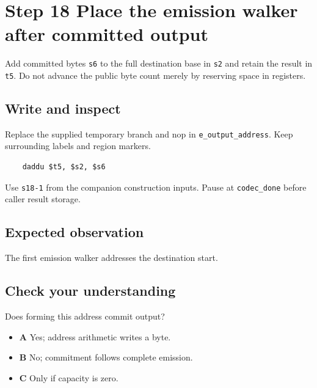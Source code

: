 \section{Step 18 Place the emission walker after committed output}\label{delta-s18}

Add committed bytes \texttt{s6} to the full destination base in \texttt{s2} and retain the result in \texttt{t5}. Do not advance the public byte count merely by reserving space in registers.

\subsection{Write and inspect}
Replace the supplied temporary branch and nop in \texttt{e\_output\_address}. Keep surrounding labels and region markers.

\begin{verbatim}
    daddu $t5, $s2, $s6
\end{verbatim}
Use \texttt{s18-1} from the companion construction inputs. Pause at \texttt{codec\_done} before caller result storage.

\subsection{Expected observation}
The first emission walker addresses the destination start.

\subsection{Check your understanding}
Does forming this address commit output?

\begin{itemize}
\item \textbf{A} Yes; address arithmetic writes a byte.
\item \textbf{B} No; commitment follows complete emission.
\item \textbf{C} Only if capacity is zero.
\end{itemize}
